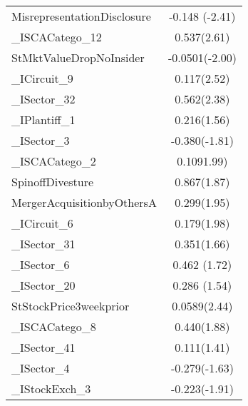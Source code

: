 \begin{table}[H]
\begin{tabular}{l*{1}{c}}
MisrepresentationDisclosure&      -0.148 (-2.41)\\
               
\_ISCACatego\_12      &       0.537(2.61)\\
              
StMktValueDropNoInsider&     -0.0501(-2.00)\\
              
\_ICircuit\_9         &       0.117(2.52)\\
                
\_ISector\_32         &       0.562(2.38)\\
                
\_IPlantiff\_1        &       0.216(1.56)\\
                   
\_ISector\_3          &      -0.380(-1.81)\\
                
\_ISCACatego\_2       &       0.1091.99)\\
                    
SpinoffDivesture    &       0.867(1.87)\\
                  
MergerAcquisitionbyOthersA&       0.299(1.95)\\
                   
\_ICircuit\_6         &       0.179(1.98)\\
               
\_ISector\_31         &       0.351(1.66)\\
                   
\_ISector\_6          &       0.462 (1.72)\\
                   
\_ISector\_20         &       0.286 (1.54)\\
                    
StStockPrice3weekprior&      0.0589(2.44)\\
                
\_ISCACatego\_8       &       0.440(1.88)\\
                
\_ISector\_41         &       0.111(1.41)\\
            
\_ISector\_4          &      -0.279(-1.63)\\
                  
\_IStockExch\_3       &      -0.223(-1.91)\\
                 

\end{tabular}
\end{table}
